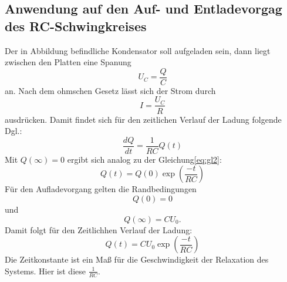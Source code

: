 \subsection{Anwendung auf den Auf- und Entladevorgag des RC-Schwingkreises}
Der in Abbildung befindliche Kondensator soll aufgeladen sein, dann liegt zwischen den Platten eine Spanung
\begin{equation}
  U_C=\frac{Q}{C}
\end{equation}
an.
Nach dem ohmschen Gesetz lässt sich der Strom durch
\begin{equation}
  I = \frac{U_C}{R}
\end{equation}
ausdrücken.
Damit findet sich für den zeitlichen Verlauf der Ladung folgende Dgl.:
\begin{equation}
  \frac{dQ}{dt}=\frac{1}{RC}Q(t)
\end{equation}
Mit $Q(\infty)=0$ ergibt sich analog zu der Gleichung\eqref{eq:gl2}:
\begin{equation}
  Q(t)=Q(0)\exp(\frac{-t}{RC})
\end{equation}
Für den Aufladevorgang gelten die Randbedingungen
\begin{equation}
  Q(0)=0
\end{equation}
und
\begin{equation}
  Q(\infty)=CU_0 .
\end{equation}
Damit folgt für den Zeitlichhen Verlauf der Ladung:
\begin{equation}
  Q(t) = CU_0 \exp(\frac{-t}{RC})
\end{equation}
Die Zeitkonstante ist ein Maß für die Geschwindigkeit der Relaxation des Systems. Hier ist diese $\frac{1}{RC}$.

